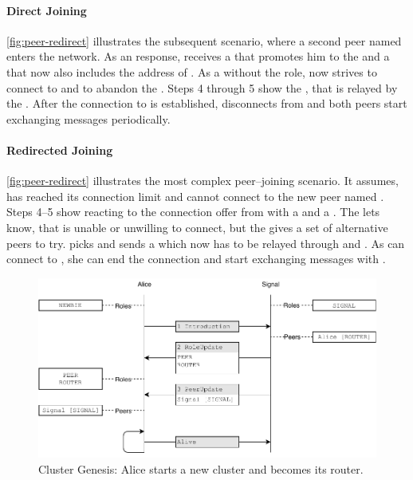 \paragraph{Direct Joining}
\vref{fig:peer-redirect} illustrates the subsequent scenario, where a second peer named \bob enters the network. As an \introduction response, \bob receives a \roleUpdate that promotes him to the \peerRole and a \peerUpdate that now also includes the address of \routerRole \alice. As a \peerRole without the \routerRole role, \bob now strives to connect to \alice and to abandon the \signal. Steps 4 through 5 show the \connectionNegotiation, that is relayed by the \signal. After the connection to \alice is established, \bob disconnects from \signal and both peers start exchanging \peerUpdate messages periodically.

\paragraph{Redirected Joining}
\vref{fig:peer-redirect} illustrates the most complex peer–joining scenario. It assumes, \alice has reached its connection limit and cannot connect to the new peer named \zoe. Steps 4–5 show \alice reacting to the connection offer from \zoe with a \rejection and a \peerUpdate. The \rejection lets \zoe know, that \alice is unable or unwilling to connect, but the \peerUpdate gives a set of alternative peers to try. \zoe picks \bob and sends a \connectionNegotiation which now has to be relayed through \signal and \alice. As \bob can connect to \zoe, she can end the \signal connection and start exchanging \peerUpdate messages with \bob.

\begin{figure}
\centering
\includegraphics[width=1\textwidth]{graphics/design/genesis.pdf}
\caption{Cluster Genesis: Alice starts a new cluster and becomes its router.}
\label{fig:genesis}
\end{figure}

